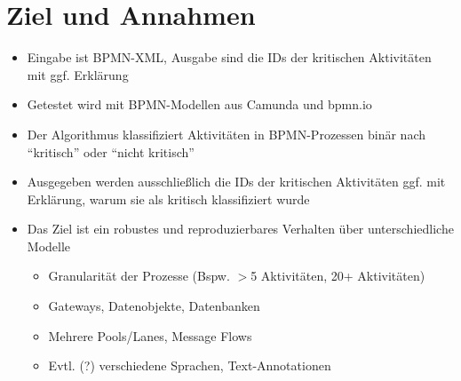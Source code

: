 \section{Ziel und Annahmen}\label{sec:ziel-und-annahmen}

\begin{itemize}
    \item Eingabe ist BPMN-XML, Ausgabe sind die IDs der kritischen Aktivitäten mit ggf. Erklärung
    \item Getestet wird mit BPMN-Modellen aus Camunda und bpmn.io
    \item Der Algorithmus klassifiziert Aktivitäten in BPMN-Prozessen binär nach ``kritisch'' oder ``nicht kritisch''
    \item Ausgegeben werden ausschließlich die IDs der kritischen Aktivitäten ggf. mit Erklärung, warum sie als kritisch klassifiziert wurde
    \item Das Ziel ist ein robustes und reproduzierbares Verhalten über unterschiedliche Modelle
    \begin{itemize}
        \item Granularität der Prozesse (Bspw. $>$5 Aktivitäten, 20+ Aktivitäten)
        \item Gateways, Datenobjekte, Datenbanken
        \item Mehrere Pools/Lanes, Message Flows
        \item Evtl. (?) verschiedene Sprachen, Text-Annotationen
    \end{itemize}
\end{itemize}